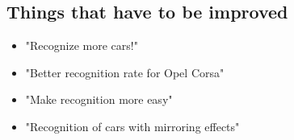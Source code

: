 \subsection{Things that have to be improved}
\begin{itemize}
  \item "Recognize more cars!"
  \item "Better recognition rate for Opel Corsa"
  \item "Make recognition more easy"
  \item "Recognition of cars with mirroring effects"
\end{itemize}



